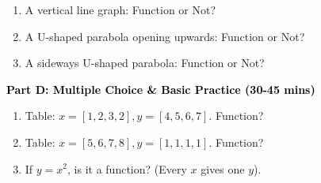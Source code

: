 \documentclass[12pt, letterpaper, fleqn]{article}
\newcommand{\blank}{\underline{\hspace{2.2cm}}}
\begin{document}
\begin{enumerate}[itemsep=2.5cm, leftmargin=0.6cm, resume]
\item A vertical line graph: Function or Not? \blank
\item A U-shaped parabola opening upwards: Function or Not? \blank
\item A sideways U-shaped parabola: Function or Not? \blank
\end{enumerate}

\newpage

\begin{tcolorbox}[colback=customteal!20]
\large\textcolor{black}{\textbf{Part D: Multiple Choice \& Basic Practice (30-45 mins)}}
\end{tcolorbox}

\vspace{3mm}

\begin{enumerate}[itemsep=2.5cm, leftmargin=0.6cm, resume]
\item Table: $x = [1, 2, 3, 2], y = [4, 5, 6, 7]$. Function? \blank
\item Table: $x = [5, 6, 7, 8], y = [1, 1, 1, 1]$. Function? \blank
\item If $y = x^2$, is it a function? (Every $x$ gives one $y$). \blank
\end{enumerate}
\end{document}

